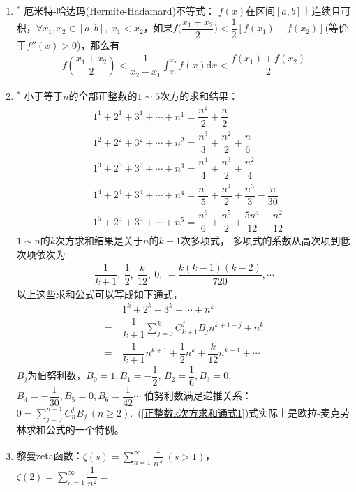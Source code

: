 \documentclass{article}
\newif\ifte
\renewcommand{\d}{\mathrm{d}}
\renewcommand\geq\geqslant
\begin{document}
\begin{multicols}{2}
\begin{enumerate}[leftmargin=20pt]
\item $^*$ 厄米特-哈达玛(Hermite-Hadamard)不等式：
$ f(x) $在区间$ [a,b] $上连续且可积，$ \forall x_1,x_2\in [a,b],\ 
x_1<x_2 $，如果$ f\Big(\dfrac{x_1+x_2}{2}\Big)<
\dfrac{1}{2}[f(x_1)+f(x_2)] $(等价于$ f''(x)>0 $)，那么有 
\begin{align*}
    f\left(\dfrac{x_1+x_2}{2}\right)<\dfrac{1}{x_2-x_1}
    \int_{x_1}^{x_2}f(x)\d x< \dfrac{f(x_1)+f(x_2)}{2}
\end{align*}

\item $^*$ \label{正整数k次方求和}小于等于$ n $的全部正整数的$ 1\sim 5 $次方的求和结果：
\begin{align*}
    & 1^1+2^1+3^1+\cdots +n^1=\dfrac{n^2}{2}+\dfrac{n}{2}\\
    & 1^2+2^2+3^2+\cdots +n^2=\dfrac{n^3}{3}+
        \dfrac{n^2}{2}+\dfrac{n}{6}\\
    & 1^3+2^3+3^3+\cdots +n^3=\dfrac{n^4}{4}+
        \dfrac{n^3}{2}+\dfrac{n^2}{4} \\
    & 1^4+2^4+3^4+\cdots +n^4=\dfrac{n^5}{5}+\dfrac{n^4}{2}
        +\dfrac{n^3}{3}-\dfrac{n}{30} \\
    & 1^5+2^5+3^5+\cdots +n^5=\dfrac{n^6}{6}+\dfrac{n^5}{2}
        +\dfrac{5n^4}{12}-\dfrac{n^2}{12} 
\end{align*}
$ 1\sim n $的$ k $次方求和结果是关于$ n $的$ k+1 $次多项式，
多项式的系数从高次项到低次项依次为
\begin{gather*}
    \dfrac{1}{k+1},\ \dfrac{1}{2},\ \dfrac{k}{12},\ 0,
    \ -\dfrac{k(k-1)(k-2)}{720},\cdots
\end{gather*}
以上这些求和公式可以写成如下通式，
\begin{align}
    &\ 1^k+2^k+3^k+\cdots +n^k \nonumber \\=&\ \dfrac{1}{k+1}
    \sum_{j=0}^{k}C_{k+1}^{j}B_{j}n^{k+1-j}+n^{k}
    \label{正整数k次方求和通式1} \\
    =&\ \dfrac{1}{k+1}n^{k+1}+\dfrac{1}{2}n^k+\dfrac{k}{12}n^{k-1}+\cdots
    \label{正整数k次方求和通式2}
\end{align}
$ B_j $为伯努利数，$ B_0=1,B_1=-\dfrac{1}{2} $,
$ B_2=\dfrac{1}{6},B_3=0 $,$ B_4=-\dfrac{1}{30},B_5=0,B_6=\dfrac{1}{42}\cdots$
伯努利数满足递推关系：$ 0=\sum\limits_{j=0}^{n-1}C_n^jB_j\ (n\geq 2) $.\ 
(\ref{正整数k次方求和通式1})式实际上是欧拉-麦克劳林求和公式的一个特例。

\item 黎曼zeta函数：$ \zeta(s)=\sum\limits_{n=1}^{\infty} 
\dfrac{1}{n^s}\ (s>1) $，\\ $ \zeta(2)=\sum\limits_{n=1}^{\infty}
\dfrac{1}{n^2}=\underline{\ \ifte \dfrac{\pi^2}{6}
\else \hspace{2cm} \fi\ } $. 
 

\end{enumerate}
\end{multicols}
\end{document}
